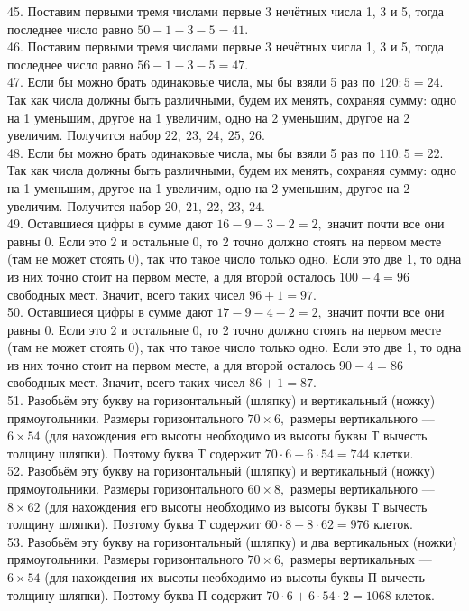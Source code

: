 \documentclass[12pt]{article}
\begin{document}
45. Поставим первыми тремя числами первые 3 нечётных числа 1, 3 и 5, тогда последнее число равно $50-1-3-5=41.$\\
46. Поставим первыми тремя числами первые 3 нечётных числа 1, 3 и 5, тогда последнее число равно $56-1-3-5=47.$\\
47. Если бы можно брать одинаковые числа, мы бы взяли 5 раз по $120:5=24.$ Так как числа должны быть различными, будем их менять, сохраняя сумму: одно на 1 уменьшим, другое на 1 увеличим, одно на 2 уменьшим, другое на 2 увеличим. Получится набор $22,\ 23,\ 24,\ 25,\ 26.$\\
48. Если бы можно брать одинаковые числа, мы бы взяли 5 раз по $110:5=22.$ Так как числа должны быть различными, будем их менять, сохраняя сумму: одно на 1 уменьшим, другое на 1 увеличим, одно на 2 уменьшим, другое на 2 увеличим. Получится набор $20,\ 21,\ 22,\ 23,\ 24.$\\
49. Оставшиеся цифры в сумме дают $16-9-3-2=2,$ значит почти все они равны 0. Если это 2 и остальные 0, то 2 точно должно стоять на первом месте (там не может стоять 0), так что такое число только одно. Если это две 1, то одна из них точно стоит на первом месте, а для второй осталось $100-4=96$ свободных мест. Значит, всего таких чисел $96+1=97.$\\
50. Оставшиеся цифры в сумме дают $17-9-4-2=2,$ значит почти все они равны 0. Если это 2 и остальные 0, то 2 точно должно стоять на первом месте (там не может стоять 0), так что такое число только одно. Если это две 1, то одна из них точно стоит на первом месте, а для второй осталось $90-4=86$ свободных мест. Значит, всего таких чисел $86+1=87.$\\
51. Разобьём эту букву на горизонтальный (шляпку) и вертикальный (ножку) прямоугольники. Размеры горизонтального $70\times6,$ размеры вертикального --- $6\times54$ (для нахождения его высоты необходимо из высоты буквы Т вычесть толщину шляпки). Поэтому буква Т содержит $70\cdot6+6\cdot54=744$ клетки.\\
52. Разобьём эту букву на горизонтальный (шляпку) и вертикальный (ножку) прямоугольники. Размеры горизонтального $60\times8,$ размеры вертикального --- $8\times62$ (для нахождения его высоты необходимо из высоты буквы Т вычесть толщину шляпки). Поэтому буква Т содержит $60\cdot8+8\cdot62=976$ клеток.\\
53. Разобьём эту букву на горизонтальный (шляпку) и два вертикальных (ножки) прямоугольники. Размеры горизонтального $70\times6,$ размеры вертикальных --- $6\times54$ (для нахождения их высоты необходимо из высоты буквы П вычесть толщину шляпки). Поэтому буква П содержит $70\cdot6+6\cdot54\cdot2=1068$ клеток.\\
\end{document}
